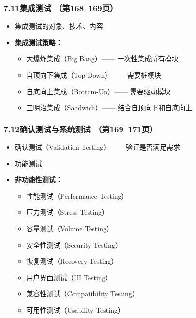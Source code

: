 \documentclass[12pt,a4paper]{ctexart}
\begin{document}
\subsubsection{7.11\quad 集成测试 \hfill（第168--169页）}
\begin{itemize}
    \item 集成测试的对象、技术、内容
    \item \textbf{集成测试策略：}
    \begin{itemize}
        \item 大爆炸集成（Big Bang）—— 一次性集成所有模块
        \item 自顶向下集成（Top-Down）—— 需要桩模块
        \item 自底向上集成（Bottom-Up）—— 需要驱动模块
        \item 三明治集成（Sandwich）—— 结合自顶向下和自底向上
    \end{itemize}
\end{itemize}

\subsubsection{7.12\quad 确认测试与系统测试 \hfill（第169--171页）}
\begin{itemize}
    \item 确认测试（Validation Testing）—— 验证是否满足需求
    \item 功能测试
    \item \textbf{非功能性测试：}
    \begin{itemize}
        \item 性能测试（Performance Testing）
        \item 压力测试（Stress Testing）
        \item 容量测试（Volume Testing）
        \item 安全性测试（Security Testing）
        \item 恢复测试（Recovery Testing）
        \item 用户界面测试（UI Testing）
        \item 兼容性测试（Compatibility Testing）
        \item 可用性测试（Usability Testing）
    \end{itemize}
\end{itemize}
\end{document}
